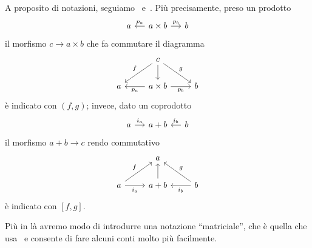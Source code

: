 A proposito di notazioni, seguiamo~\cite{leinster:categories}
e~\cite{riehl:categories}. Più precisamente, preso un prodotto
\[
  \begin{tikzcd}[column sep=small]
    a & a \times b \ar["{p_a}", l, swap] \ar["{p_b}", r] & b
  \end{tikzcd}
\]
il morfismo \(c \to a \times b\) che fa commutare il diagramma
\[
  \begin{tikzcd}
    & c \ar["{f}", dl, swap] \ar[d] \ar["{g}", dr] \\
    a & a \times b \ar["{p_a}", l] \ar["{p_b}", r, swap] & b
  \end{tikzcd}
\]
è indicato con \((f, g)\); invece, dato un coprodotto
\[
  \begin{tikzcd}[column sep=small]
    a \ar["{i_a}", r] & a + b & b \ar["{i_b}", l, swap]
  \end{tikzcd}
\]
il morfismo \(a+b \to c\) rendo commutativo
\[
  \begin{tikzcd}
    & a \\
    a \ar["{i_a}", r, swap] \ar["{f}", ur] & a + b \ar[u] & b
    \ar["{i_b}", l] \ar["{g}", ul, swap]
  \end{tikzcd}
\]
è indicato con \([f, g]\).

Più in là avremo modo di introdurre una notazione ``matriciale'', che è
quella che usa~\cite{buehler:exactcategories} e consente di fare alcuni
conti molto più facilmente.

